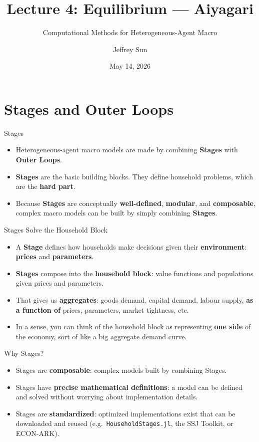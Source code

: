 \documentclass[10pt,aspectratio=169]{beamer}
\title{Lecture 4: Equilibrium --- Aiyagari}
\subtitle{Computational Methods for Heterogeneous-Agent Macro}
\author{Jeffrey Sun}
\institute{University of Toronto}
\date{May 14, 2026}
\begin{document}
\maketitle

\section{Stages and Outer Loops}

\begin{frame}{Stages}
  \begin{itemize}
    \item Heterogeneous-agent macro models are made by combining \textbf{Stages} with \textbf{Outer Loops}.
    \item \textbf{Stages} are the basic building blocks. They define household problems, which are the \textbf{hard part}.
    \item Because \textbf{Stages} are conceptually \textbf{well-defined}, \textbf{modular}, and \textbf{composable}, complex macro models can be built by simply combining \textbf{Stages}.
  \end{itemize}
\end{frame}

\begin{frame}{Stages Solve the Household Block}
  \begin{itemize}
    \item A \textbf{Stage} defines how households make decisions given their \textbf{environment}: \textbf{prices} and \textbf{parameters}.
    \item \textbf{Stages} compose into the \textbf{household block}: value functions and populations given prices and parameters.
    \item That gives us \textbf{aggregates}: goods demand, capital demand, labour supply, \textbf{as a function of} prices, parameters, market tightness, etc.
    \item In a sense, you can think of the household block as representing \textbf{one side} of the economy, sort of like a big aggregate demand curve.
  \end{itemize}
\end{frame}

\begin{frame}{Why Stages?}
  \begin{itemize}
    \item Stages are \textbf{composable}: complex models built by combining Stages.
    \item Stages have \textbf{precise mathematical definitions}: a model can be defined and solved without worrying about implementation details.
    \item Stages are \textbf{standardized}: optimized implementations exist that can be downloaded and reused (e.g.\ \texttt{HouseholdStages.jl}, the SSJ Toolkit, or ECON-ARK).
  \end{itemize}

\end{frame}
\end{document}
